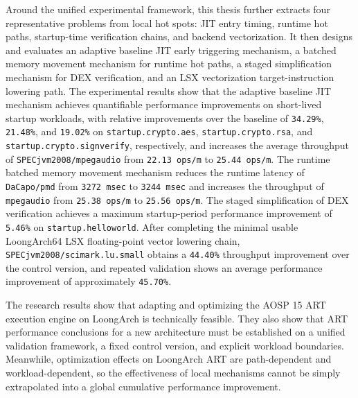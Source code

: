 Around the unified experimental framework, this thesis further extracts four representative problems from local hot spots: JIT entry timing, runtime hot paths, startup-time verification chains, and backend vectorization. It then designs and evaluates an adaptive baseline JIT early triggering mechanism, a batched memory movement mechanism for runtime hot paths, a staged simplification mechanism for DEX verification, and an LSX vectorization target-instruction lowering path. The experimental results show that the adaptive baseline JIT mechanism achieves quantifiable performance improvements on short-lived startup workloads, with relative improvements over the baseline of \texttt{34.29\%}, \texttt{21.48\%}, and \texttt{19.02\%} on \texttt{startup.crypto.aes}, \texttt{startup.crypto.rsa}, and \texttt{startup.crypto.signverify}, respectively, and increases the average throughput of \texttt{SPECjvm2008/mpegaudio} from \texttt{22.13\,ops/m} to \texttt{25.44\,ops/m}. The runtime batched memory movement mechanism reduces the runtime latency of \texttt{DaCapo/pmd} from \texttt{3272\,msec} to \texttt{3244\,msec} and increases the throughput of \texttt{mpegaudio} from \texttt{25.38\,ops/m} to \texttt{25.56\,ops/m}. The staged simplification of DEX verification achieves a maximum startup-period performance improvement of \texttt{5.46\%} on \texttt{startup.helloworld}. After completing the minimal usable LoongArch64 LSX floating-point vector lowering chain, \texttt{SPECjvm2008/scimark.lu.small} obtains a \texttt{44.40\%} throughput improvement over the control version, and repeated validation shows an average performance improvement of approximately \texttt{45.70\%}.

The research results show that adapting and optimizing the AOSP 15 ART execution engine on LoongArch is technically feasible. They also show that ART performance conclusions for a new architecture must be established on a unified validation framework, a fixed control version, and explicit workload boundaries. Meanwhile, optimization effects on LoongArch ART are path-dependent and workload-dependent, so the effectiveness of local mechanisms cannot be simply extrapolated into a global cumulative performance improvement.

